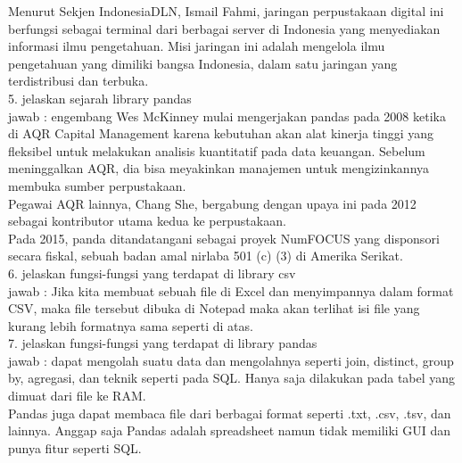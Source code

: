 Menurut Sekjen IndonesiaDLN,  Ismail Fahmi, jaringan perpustakaan digital ini berfungsi sebagai terminal dari berbagai server di Indonesia yang menyediakan informasi ilmu pengetahuan. Misi jaringan ini adalah mengelola ilmu pengetahuan yang dimiliki bangsa Indonesia, dalam satu jaringan yang terdistribusi dan terbuka.\\

5. jelaskan sejarah library pandas\\
jawab : engembang Wes McKinney mulai mengerjakan pandas pada 2008 ketika di AQR Capital Management karena kebutuhan akan alat kinerja tinggi yang fleksibel untuk melakukan analisis kuantitatif pada data keuangan. Sebelum meninggalkan AQR, dia bisa meyakinkan manajemen untuk mengizinkannya membuka sumber perpustakaan.\\

Pegawai AQR lainnya, Chang She, bergabung dengan upaya ini pada 2012 sebagai kontributor utama kedua ke perpustakaan.\\

Pada 2015, panda ditandatangani sebagai proyek NumFOCUS yang disponsori secara fiskal, sebuah badan amal nirlaba 501 (c) (3) di Amerika Serikat.\\

6. jelaskan fungsi-fungsi yang terdapat di library csv\\
jawab : Jika kita membuat sebuah file di Excel dan menyimpannya dalam format CSV, maka file tersebut dibuka di Notepad maka akan terlihat isi file yang kurang lebih formatnya sama seperti di atas.\\

7. jelaskan fungsi-fungsi yang terdapat di library pandas\\
jawab : dapat mengolah suatu data dan mengolahnya seperti join, distinct, group by, agregasi, dan teknik seperti pada SQL. Hanya saja dilakukan pada tabel yang dimuat dari file ke RAM.\\

Pandas juga dapat membaca file dari berbagai format seperti .txt, .csv, .tsv, dan lainnya. Anggap saja Pandas adalah spreadsheet namun tidak memiliki GUI dan punya fitur seperti SQL.\\

